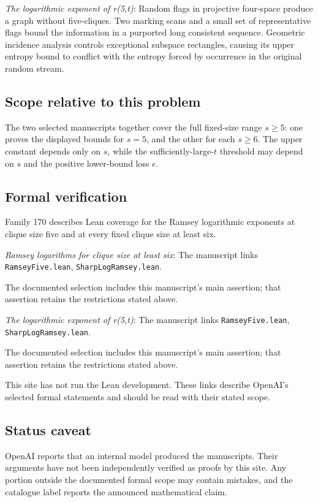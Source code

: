 \documentclass[11pt]{article}
\begin{document}
\textit{The logarithmic exponent of r(5,t)}: Random flags in projective four-space produce a graph without five-cliques. Two marking scans and a small set of representative flags bound the information in a purported long consistent sequence. Geometric incidence analysis controls exceptional subspace rectangles, causing its upper entropy bound to conflict with the entropy forced by occurrence in the original random stream.

\subsection{Scope relative to this problem}
The two selected manuscripts together cover the full fixed-size range $s\ge5$: one proves the displayed bounds for $s=5$, and the other for each $s\ge6$. The upper constant depends only on $s$, while the sufficiently-large-$t$ threshold may depend on $s$ and the positive lower-bound loss $\epsilon$.

\subsection{Formal verification}
Family 170 describes Lean coverage for the Ramsey logarithmic exponents at clique size five and at every fixed clique size at least six.

\textit{Ramsey logarithms for clique size at least six}: The manuscript links \texttt{RamseyFive.lean}, \texttt{SharpLogRamsey.lean}.

The documented selection includes this manuscript’s main assertion; that assertion retains the restrictions stated above.

\textit{The logarithmic exponent of r(5,t)}: The manuscript links \texttt{RamseyFive.lean}, \texttt{SharpLogRamsey.lean}.

The documented selection includes this manuscript’s main assertion; that assertion retains the restrictions stated above.

This site has not run the Lean development. These links describe OpenAI’s selected formal statements and should be read with their stated scope.

\subsection{Status caveat}
OpenAI reports that an internal model produced the manuscripts. Their arguments have not been independently verified as proofs by this site. Any portion outside the documented formal scope may contain mistakes, and the catalogue label reports the announced mathematical claim.
\end{document}
